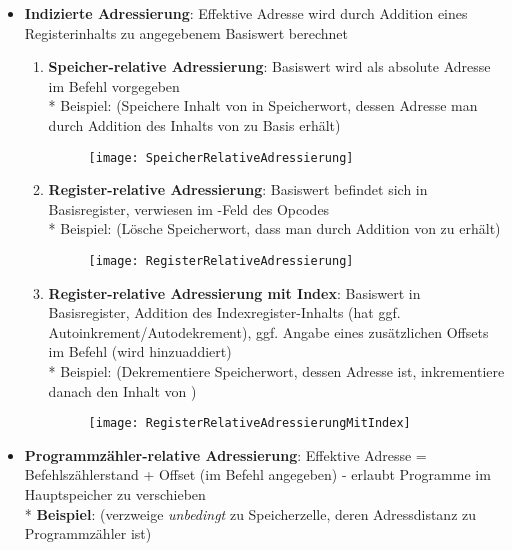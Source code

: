 \begin{itemize}
	\item \textbf{Indizierte Adressierung}: Effektive Adresse wird durch Addition eines Registerinhalts zu angegebenem Basiswert berechnet
	\begin{enumerate}
		\item \textbf{Speicher-relative Adressierung}: Basiswert wird als absolute Adresse im Befehl vorgegeben \\* Beispiel:  (Speichere Inhalt von  in Speicherwort, dessen Adresse man durch Addition des Inhalts von  zu Basis  erhält)
		\begin{figure}[H]
		  \centering
		  \texttt{[image: SpeicherRelativeAdressierung]}
		  \label{SpeicherRelativeAdressierung}
		\end{figure}
		\item \textbf{Register-relative Adressierung}: Basiswert befindet sich in Basisregister, verwiesen im -Feld des Opcodes \\* Beispiel:  (Lösche Speicherwort, dass man durch Addition von  zu  erhält)
		\begin{figure}[H]
		  \centering
		  \texttt{[image: RegisterRelativeAdressierung]}
		  \label{RegisterRelativeAdressierung}
		\end{figure}
		\item \textbf{Register-relative Adressierung mit Index}: Basiswert in Basisregister, Addition des Indexregister-Inhalts (hat ggf. Autoinkrement/Autodekrement), ggf. Angabe eines zusätzlichen Offsets im Befehl (wird hinzuaddiert) \\* Beispiel:  (Dekrementiere Speicherwort, dessen Adresse  ist, inkrementiere danach den Inhalt von )
		\begin{figure}[H]
		  \centering
		  \texttt{[image: RegisterRelativeAdressierungMitIndex]}
		  \label{RegisterRelativeAdressierungMitIndex}
		\end{figure}
	\end{enumerate}

	\item \textbf{Programmzähler-relative Adressierung}: Effektive Adresse = Befehlszählerstand + Offset (im Befehl angegeben) - erlaubt Programme im Hauptspeicher zu verschieben \\* \textbf{Beispiel}:  (verzweige \emph{unbedingt} zu Speicherzelle, deren Adressdistanz zu Programmzähler  ist)
\end{itemize}